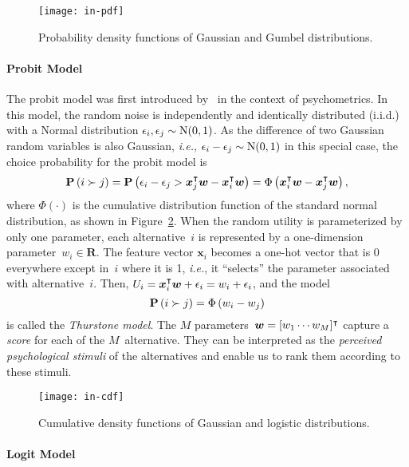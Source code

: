 \begin{figure}
	\centering
	\texttt{[image: in-pdf]}
	\caption{Probability density functions of Gaussian and Gumbel distributions.}
	\label{in:fig:pdf}
\end{figure}

\paragraph{Probit Model}

The probit model was first introduced by~\citet{thurstone1927law} in the context of psychometrics.
In this model, the random noise is independently and identically distributed (i.i.d.) with a Normal distribution $\epsilon_i, \epsilon_j \sim \mathrm{N}( 0, 1 )$.
As the difference of two Gaussian random variables is also Gaussian, \textit{i.e.}, $\epsilon_i - \epsilon_j \sim \mathrm{N}( 0, 1 )$ in this special case, the choice probability for the probit model is
\begin{equation*}
	\mathbf{P}\left( i \succ j \right) = \mathbf{P}\left( \epsilon_i - \epsilon_j > \bm{x}_j^\intercal \bm{w} - \bm{x}_i^\intercal \bm{w} \right) = \Phi \left( \bm{x}_i^\intercal \bm{w} - \bm{x}_j^\intercal \bm{w} \right),
\end{equation*}
where $\Phi( \cdot )$ is the cumulative distribution function of the standard normal distribution, as shown in Figure~\ref{in:fig:cdf}.
When the random utility is parameterized by only one parameter, each alternative~$i$ is represented by a one-dimension parameter~$w_i \in \mathbf{R}$.
The feature vector $\bm{x}_i$ becomes a one-hot vector that is 0 everywhere except in~$i$ where it is 1, \textit{i.e.}, it ``selects'' the parameter associated with alternative~$i$.
Then, $U_i = \bm{x}_i^\intercal \bm{w} + \epsilon_i = w_i + \epsilon_i$, and the model
\begin{equation*}
	\mathbf{P}\left( i \succ j \right) = \Phi \left( w_i - w_j \right)
\end{equation*}
is called the \emph{Thurstone model}.
The $M$ parameters~$\bm{w} = [w_1 \cdots w_M]^\intercal$ capture a \emph{score} for each of the $M$~alternative.
They can be interpreted as the \emph{perceived psychological stimuli} of the alternatives and enable us to rank them according to these stimuli.

\begin{figure}
	\centering
	\texttt{[image: in-cdf]}
	\caption{Cumulative density functions of Gaussian and logistic distributions.}
	\label{in:fig:cdf}
\end{figure}

\paragraph{Logit Model}

